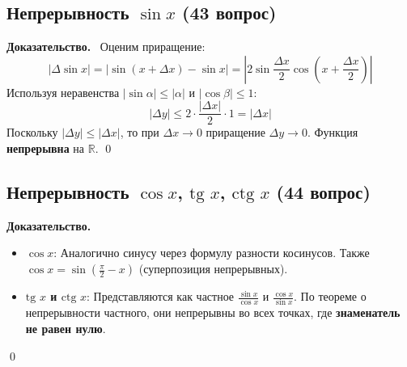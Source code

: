 \documentclass[a4paper,12pt]{article}
\newcommand{\tsubsection}[2]{\subsection[#1]{\texorpdfstring{#2}{#1}}}
\newcommand{\myproof}{\textbf{Доказательство.}\ }
\begin{document}
	
	
	
	\tsubsection{Непрерывность синуса (43 вопрос)}{Непрерывность $\sin x$ (43 вопрос)}
	
	\myproof
	Оценим приращение:
	\[ |\Delta \sin x| = |\sin(x + \Delta x) - \sin x| = |2 \sin \frac{\Delta x}{2} \cos(x + \frac{\Delta x}{2})| \]
	Используя неравенства $|\sin \alpha| \le |\alpha|$ и $|\cos \beta| \le 1$:
	\[ |\Delta y| \le 2 \cdot \frac{|\Delta x|}{2} \cdot 1 = |\Delta x| \]
	Поскольку $|\Delta y| \le |\Delta x|$, то при $\Delta x \to 0$ приращение $\Delta y \to 0$. Функция \textbf{непрерывна} на $\mathbb{R}$. \qed
		
	\begin{center}
	\end{center}
	
	
	
	
	
	\newpage
	\tsubsection{Непрерывность тригонометрических функций (44 вопрос)}{Непрерывность $\cos x$, $\text{tg } x$, $\text{ctg } x$ (44 вопрос)}
	
	\myproof
	\begin{itemize}
		\item \textbf{$\cos x$}: Аналогично синусу через формулу разности косинусов. Также $\cos x = \sin(\frac{\pi}{2} - x)$ (суперпозиция непрерывных).
		\item \textbf{$\text{tg } x$ и $\text{ctg } x$}: Представляются как частное $\frac{\sin x}{\cos x}$ и $\frac{\cos x}{\sin x}$. По теореме о непрерывности частного, они непрерывны во всех точках, где \textbf{знаменатель не равен нулю}.
	\end{itemize} \qed
	
\end{document}
